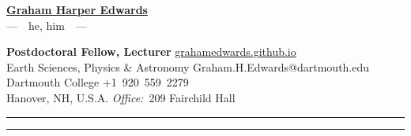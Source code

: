 \documentclass[10pt]{article}
\begin{document}
\begin{center}
\LARGE\textbf{\underline{Graham Harper Edwards}}\\ [.3em]
\large ---~~he, him~~---
\end{center}

\textbf{Postdoctoral Fellow, Lecturer} \hfill \href{https://grahamedwards.github.io}{grahamedwards.github.io} \\
Earth Sciences, Physics \& Astronomy \hfill Graham.H.Edwards{\small @dartmouth.edu} \\
Dartmouth College \hfill +1~920~559~2279  \\
Hanover, NH, U.S.A.	\hfill \textit{Office:}~209 Fairchild Hall

\vspace{1em}





















\begin{center}{\rule{2.5in}{0.5pt}}\end{center}  \begin{center}\vspace{-16pt} {\rule{2.5in}{0.5pt}}\end{center}



\end{document}
